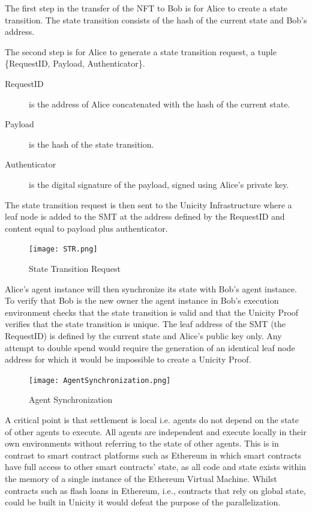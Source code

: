 \documentclass{article}
\begin{document}
The first step in the transfer of the NFT to Bob is for Alice to create a state transition. The state transition consists of the hash of the current state and Bob's address.


The second step is for Alice to generate a state transition request, a tuple \{RequestID, Payload, Authenticator\}.

\begin{description}
    \item[RequestID] is the address of Alice concatenated with the hash of the current state.
    \item[Payload] is the hash of the state transition.
    \item [Authenticator] is the digital signature of the payload, signed using Alice’s private key.
\end{description}

The state transition request is then sent to the Unicity Infrastructure where a leaf node is added to the SMT at the address defined by the RequestID and content equal to payload plus authenticator.

\begin{figure}[H]
    \centering
    \texttt{[image: STR.png]}
    \caption{State Transition Request}
    \label{fig:STR}
\end{figure}

Alice's agent instance will then synchronize its state with Bob's agent instance. To verify that Bob is the new owner the agent instance in Bob's execution environment checks that the state transition is valid and that the Unicity Proof verifies that the state transition is unique. The leaf address of the SMT (the RequestID) is defined by the current state and Alice’s public key only.  Any attempt to double spend would require the generation of an identical leaf node address for which it would be impossible to create a Unicity Proof.

\begin{figure}[H]
    \centering
    \texttt{[image: AgentSynchronization.png]}
    \caption{Agent Synchronization}
    \label{fig:AgentSynch}
\end{figure}


A critical point is that settlement is local i.e. agents do not depend on the state of other agents to execute. All agents are independent and execute locally in their own environments without referring to the state of other agents. This is in contrast to smart contract platforms such as Ethereum in which smart contracts have full access to other smart contracts' state, as all code and state exists within the memory of a single instance of the Ethereum Virtual Machine. Whilst contracts such as flash loans in Ethereum, i.e., contracts that rely on global state, could be built in Unicity it would defeat the purpose of the parallelization.
\end{document}
